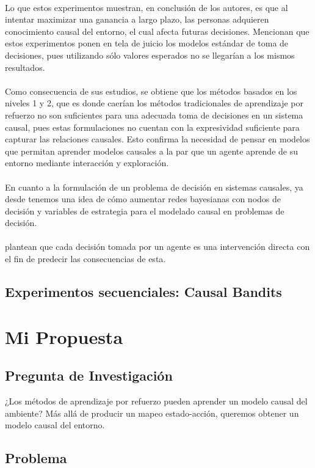 \documentclass[11pt]{article}
\theoremstyle{plain}
\begin{document}
\\
Lo que estos experimentos muestran, en conclusión de los autores, es que al intentar maximizar una ganancia a largo plazo, las personas adquieren conocimiento causal del entorno, el cual afecta futuras decisiones. Mencionan que estos experimentos ponen en tela de juicio los modelos estándar de toma de decisiones, pues utilizando sólo valores esperados no se llegarían a los mismos resultados.\\
\\
Como consecuencia de sus estudios, se obtiene que los métodos basados en los niveles 1 y 2, que es donde caerían los métodos tradicionales de aprendizaje por refuerzo no son suficientes para una adecuada toma de decisiones en un sistema causal, pues estas formulaciones no cuentan con la expresividad suficiente para capturar las relaciones causales. Esto confirma la necesidad de pensar en modelos que permitan aprender modelos causales a la par que un agente aprende de su entorno mediante interacción y exploración.\\
\\
En cuanto a la formulación de un problema de decisión en sistemas causales, ya desde \cite{dawid2002influence} tenemos una idea de cómo aumentar redes bayesianas con nodos de decisión y variables de estrategia para el modelado causal en problemas de decisión.\\
\\
\cite{hagmayer2009decision} plantean que cada decisión tomada por un agente es una intervención directa con el fin de predecir las consecuencias de esta. 

\subsection{Experimentos secuenciales: Causal Bandits}

\section{Mi Propuesta}
\subsection{Pregunta de Investigación}
¿Los métodos de aprendizaje por refuerzo pueden aprender un modelo causal del ambiente? Más allá de producir un mapeo estado-acción, queremos obtener un modelo causal del entorno.
\subsection{Problema}
\end{document}
